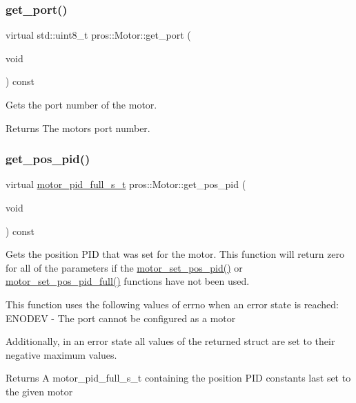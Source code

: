 \subsubsection{\texorpdfstring{get\+\_\+port()}{get\_port()}}
{\footnotesize\ttfamily virtual std\+::uint8\+\_\+t pros\+::\+Motor\+::get\+\_\+port (\begin{DoxyParamCaption}\item[{void}]{ }\end{DoxyParamCaption}) const\hspace{0.3cm}{\ttfamily [virtual]}}

Gets the port number of the motor.

\begin{DoxyReturn}{Returns}
The motor\textquotesingle{}s port number. 
\end{DoxyReturn}
\mbox{\label{classpros_1_1Motor_a32193b8d020ad1b47e1cb9f0b74a6c7d}} 
\subsubsection{\texorpdfstring{get\+\_\+pos\+\_\+pid()}{get\_pos\_pid()}}
{\footnotesize\ttfamily virtual \hyperlink{motors_8h_a0295cbf49f5c70c17b5fa962bd25febd}{motor\+\_\+pid\+\_\+full\+\_\+s\+\_\+t} pros\+::\+Motor\+::get\+\_\+pos\+\_\+pid (\begin{DoxyParamCaption}\item[{void}]{ }\end{DoxyParamCaption}) const\hspace{0.3cm}{\ttfamily [virtual]}}

Gets the position P\+ID that was set for the motor. This function will return zero for all of the parameters if the \hyperlink{motors_8h_a389e60d01741d5947a9b7330c6c8bbf7}{motor\+\_\+set\+\_\+pos\+\_\+pid()} or \hyperlink{motors_8h_a1d3273573e296507914d2626121f19ce}{motor\+\_\+set\+\_\+pos\+\_\+pid\+\_\+full()} functions have not been used.

This function uses the following values of errno when an error state is reached\+: E\+N\+O\+D\+EV -\/ The port cannot be configured as a motor

Additionally, in an error state all values of the returned struct are set to their negative maximum values.

\begin{DoxyReturn}{Returns}
A motor\+\_\+pid\+\_\+full\+\_\+s\+\_\+t containing the position P\+ID constants last set to the given motor 
\end{DoxyReturn}
\mbox{\label{classpros_1_1Motor_a70e725a94ec42dc7cbb3e460c36dcad3}} 
